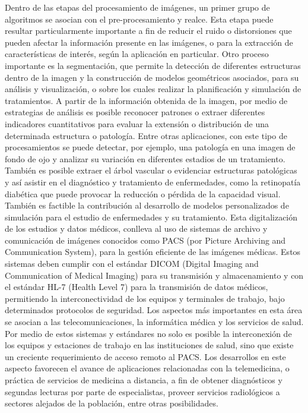 Dentro de las etapas del procesamiento de im\'agenes, un primer grupo de algoritmos se asocian con el pre-procesamiento y realce. Esta etapa puede resultar particularmente importante a fin de reducir el ruido o distorsiones que pueden afectar la informaci\'on presente en las im\'agenes, o para la extracci\'on de caracter\'isticas de inter\'es, seg\'un la aplicaci\'on en particular. Otro proceso importante es la segmentaci\'on, que permite la detecci\'on de diferentes estructuras dentro de la imagen y la construcci\'on de modelos geom\'etricos asociados, para su an\'alisis y visualizaci\'on, o sobre los cuales realizar la planificaci\'on y simulaci\'on de tratamientos. A partir de la informaci\'on obtenida de la imagen, por medio de estrategias de an\'alisis es posible reconocer patrones o extraer diferentes indicadores cuantitativos para evaluar la extensi\'on o distribuci\'on de una determinada estructura o patolog\'ia.
Entre otras aplicaciones, con este tipo de procesamientos se puede detectar, por ejemplo, una patolog\'ia en una imagen de fondo de ojo y analizar su variaci\'on en diferentes estadios de un tratamiento. Tambi\'en es posible extraer el \'arbol vascular o evidenciar estructuras patol\'ogicas y as\'i asistir en el diagn\'ostico y tratamiento de enfermedades, como la retinopat\'ia diab\'etica que puede provocar la reducci\'on o p\'erdida de la capacidad visual. Tambi\'en es factible la contribuci\'on al desarrollo de modelos personalizados de simulaci\'on para el estudio de enfermedades y su tratamiento.
 Esta digitalizaci\'on de los estudios y datos m\'edicos, conlleva al uso de sistemas de archivo y comunicaci\'on de im\'agenes conocidos como PACS (por Picture Archiving and Communication System), para la gesti\'on eficiente de las im\'agenes m\'edicas. Estos sistemas deben cumplir con el est\'andar DICOM (Digital Imaging and Communication of Medical Imaging) para su transmisi\'on y almacenamiento y con el est\'andar HL-7 (Health Level 7) para la transmisi\'on de datos m\'edicos, permitiendo la interconectividad de los equipos y terminales de trabajo, bajo determinados protocolos de seguridad.
Los aspectos más importantes en esta \'area se asocian a las telecomunicaciones, la inform\'atica m\'edica y los servicios de salud. Por medio de estos sistemas y est\'andares no solo es posible la interconexi\'on de los equipos y estaciones de trabajo en las instituciones de salud, sino que existe un creciente requerimiento de acceso remoto al PACS. Los desarrollos en este aspecto favorecen el avance de aplicaciones relacionadas con la telemedicina, o pr\'actica de servicios de medicina a distancia, a fin de obtener diagn\'osticos y segundas lecturas por parte de especialistas, proveer servicios radiol\'ogicos a sectores alejados de la poblaci\'on, entre otras posibilidades.


